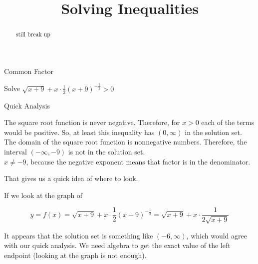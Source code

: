 \documentclass{ximera}
\title{Solving Inequalities}
\begin{document}
\begin{abstract}
still break up
\end{abstract}
\maketitle









\begin{example}  Common Factor


Solve $\sqrt{x+9} + x \cdot \frac{1}{2} (x+9)^{-\tfrac{1}{2}} > 0$





\begin{idea} Quick Analysis


The square root function is never negative.  Therefore, for $x > 0$ each of the terms would be positive.  So, at least this inequality has $(0, \infty)$ in the solution set.  \\


The domain of the square root function is nonnegative numbers.  Therefore, the interval $(-\infty, -9)$ is not in the solution set.   \\


$x \ne -9$, because the negative exponent means that factor is in the denominator.

\end{idea}



That gives us a quick idea of where to look.


\begin{explanation}






If we look at the graph of  

\[
y = f(x) = \sqrt{x+9} + x \cdot \frac{1}{2} (x+9)^{-\tfrac{1}{2}} = \sqrt{x+9} + x \cdot \frac{1}{2 \sqrt{x+9}} 
\]




\begin{center}
\end{center}




It appears that the solution set is something like  $(-6, \infty)$, which would agree with our quick analysis.  We need algebra to get the exact value of the left endpoint (looking at the graph is not enough).



\end{explanation}
\end{example}
\end{document}

